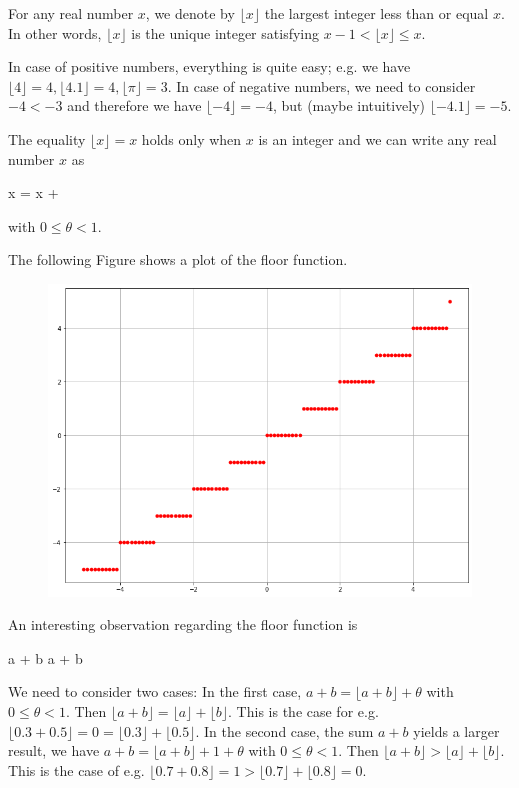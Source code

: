 
For any real number $x$, we denote by $\lfloor x \rfloor$ the largest integer less than or equal $x$. In other words, $\lfloor x \rfloor$ is the unique integer satisfying $x-1 < \lfloor x \rfloor \leq x$.

In case of positive numbers, everything is quite easy; e.g. we have $\lfloor 4 \rfloor = 4, \lfloor 4.1 \rfloor = 4, \lfloor \pi \rfloor = 3$. In case of negative numbers, we need to consider $-4 < -3$ and therefore we have $\lfloor -4 \rfloor = -4$, but (maybe intuitively) $\lfloor -4.1 \rfloor = -5$.

The equality $\lfloor x \rfloor = x$ holds only when $x$ is an integer and we can write any real number $x$ as

\bee
x = \lfloor x \rfloor + \theta
\eee

with $0 \leq \theta < 1$.

The following Figure shows a plot of the floor function.

\begin{figure}[H]
    \centering
    \includegraphics[scale=0.5]{images/floor_function.png}
\end{figure}


An interesting observation regarding the floor function is

\bee
\lfloor a + b \rfloor \geq \lfloor a \rfloor + \lfloor b \rfloor
\eee

We need to consider two cases: In the first case, $a + b = \lfloor a + b \rfloor + \theta$ with $0 \leq \theta < 1$. Then $\lfloor a+b \rfloor = \lfloor a \rfloor + \lfloor b \rfloor$. This is the case for e.g. $\lfloor 0.3 + 0.5 \rfloor = 0 = \lfloor 0.3 \rfloor + \lfloor 0.5 \rfloor$. In the second case, the sum $a + b$ yields a larger result, we have $a + b = \lfloor a + b\rfloor + 1 + \theta$ with $0 \leq \theta < 1$. Then $\lfloor a + b \rfloor > \lfloor a \rfloor + \lfloor b \rfloor$. This is the case of e.g. $\lfloor 0.7 + 0.8 \rfloor = 1 > \lfloor 0.7 \rfloor + \lfloor 0.8 \rfloor = 0$.

